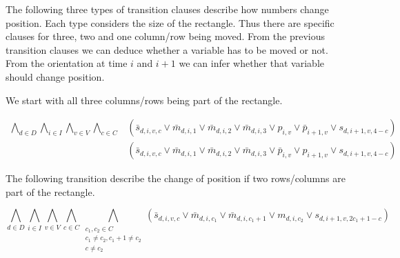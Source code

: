 \documentclass[]{llncs}
\begin{document}
The following three types of transition clauses describe how numbers change position. Each type considers the size of
the rectangle. Thus there are specific clauses for three, two and one column/row being moved. From the previous
transition clauses we can deduce whether a variable has to be moved or not. From the orientation at time $i$ and $i+1$
we can infer whether that variable should change position. 

We start with all three columns/rows being part of the rectangle. 
%
%


\begin{equation}
\begin{array}{ll}
\bigwedge_{d \in D} \bigwedge_{i\in I} \bigwedge_{v\in V} \bigwedge_{c \in C} & (\bar s_{d,i,v,c} \vee \bar
m_{d,i,1} \vee \bar m_{d,i,2} \vee \bar m_{d,i,3} \vee p_{i,v} \vee \bar p_{i+1,v} \vee s_{d,i+1,v,4-c}) \\ 
& (\bar s_{d,i,v,c} \vee  \bar m_{d,i,1} \vee \bar m_{d,i,2} \vee \bar m_{d,i,3} \vee \bar p_{i,v} \vee p_{i+1,v}
\vee s_{d,i+1,v,4-c}) 
\end{array}
\end{equation}

The following transition describe the change of position if two rows/columns are part of the rectangle.
%

\begin{equation}
\bigwedge_{d \in D} \bigwedge_{i\in I} \bigwedge_{v\in V}  \bigwedge_{c\in C} \bigwedge_{\substack{c_1,c_2 \in C
 \\ c_1 \neq c_2, c_1+1 \neq c_2 \\ c \neq c_2 }}  (\bar s_{d,i,v,c} \vee \bar
m_{d,i,c_1} \vee \bar m_{d,i,c_1+1} \vee m_{d,i,c_2} \vee s_{d,i+1,v,2c_1+1-c}) 
\end{equation}
\end{document}
